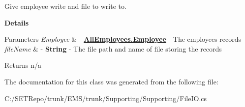 Give employee write and file to write to. 

{\bfseries Details}


\begin{DoxyParams}{Parameters}
{\em Employee} & -\/ {\bfseries \hyperlink{class_all_employees_1_1_employee}{All\+Employees.\+Employee}} -\/ The employees records \\
\hline
{\em file\+Name} & -\/ {\bfseries String} -\/ The file path and name of file storing the records\\
\hline
\end{DoxyParams}
\begin{DoxyReturn}{Returns}
n/a 
\end{DoxyReturn}


The documentation for this class was generated from the following file\+:\begin{DoxyCompactItemize}
\item 
C\+:/\+S\+E\+T\+Repo/trunk/\+E\+M\+S/trunk/\+Supporting/\+Supporting/File\+I\+O.\+cs\end{DoxyCompactItemize}
